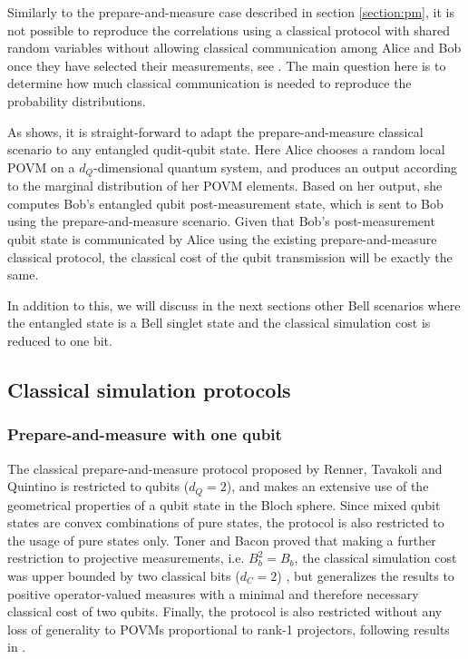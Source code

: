 Similarly to the prepare-and-measure case described in section \ref{section:pm}, it is not possible to reproduce the correlations using a classical protocol with shared random variables without allowing classical communication among Alice and Bob once they have selected their measurements, see \cite{bell1964}. The main question here is to determine how much classical communication is needed to reproduce the probability distributions.

As \cite{renner2022} shows, it is straight-forward to adapt the prepare-and-measure classical scenario to any entangled qudit-qubit state. Here Alice chooses a random local POVM on a $d_Q$-dimensional quantum system, and produces an output according to the marginal distribution of her POVM elements. Based on her output, she computes Bob's entangled qubit post-measurement state, which is sent to Bob using the prepare-and-measure scenario. Given that Bob's post-measurement qubit state is communicated by Alice using the existing prepare-and-measure classical protocol, the classical cost of the qubit transmission will be exactly the same. 

In addition to this, we will discuss in the next sections other Bell scenarios where the entangled state is a Bell singlet state and the classical simulation cost is reduced to one bit.


\subsection{Classical simulation protocols}\label{section:protocols}
\subsubsection{Prepare-and-measure with one qubit}\label{section:protocol_pm}
The classical prepare-and-measure protocol proposed by Renner, Tavakoli and Quintino \cite{renner2022} is restricted to qubits ($d_Q=2$), and makes an extensive use of the geometrical properties of a qubit state in the Bloch sphere. Since mixed qubit states are convex combinations of pure states, the protocol is also restricted to the usage of pure states only. Toner and Bacon proved that making a further restriction to projective measurements, i.e. $B_b^{2} = B_b$, the classical simulation cost was upper bounded by two classical bits ($d_C=2$) \cite{toner2003}, but \cite{renner2022} generalizes the results to positive operator-valued measures with a minimal and therefore necessary classical cost of two qubits. Finally, the protocol is also restricted without any loss of generality to POVMs proportional to rank-1 projectors, following results in \cite{barrett2002}.

